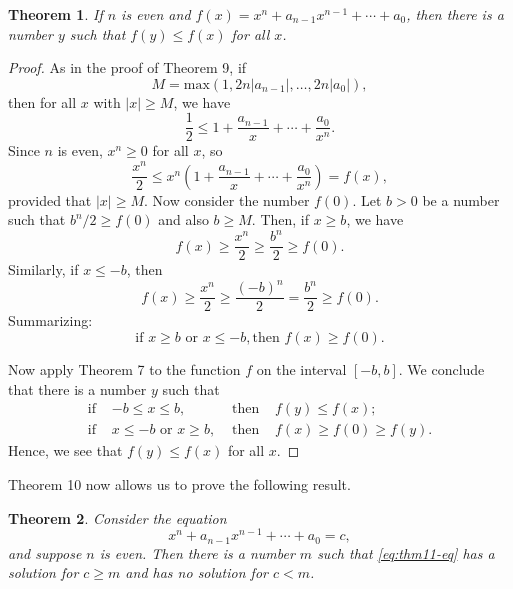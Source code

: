 \documentclass{article}
\newtheorem{theorem}{Theorem}
\begin{document}
\begin{theorem}
  If $n$ is even and $f(x) = x^n + a_{n-1}x^{n-1} + \cdots + a_0$, then there
  is a number $y$ such that $f(y) \leq f(x)$ for all $x$.
\end{theorem}

\begin{proof}
  As in the proof of Theorem 9, if \begin{equation*}
    M = \mathrm{max}(1, 2n|a_{n-1}|, \ldots, 2n|a_0|),
  \end{equation*}
  then for all $x$ with $|x| \geq M$, we have \begin{equation*}
    \frac{1}{2} \leq 1 + \frac{a_{n-1}}{x} + \cdots + \frac{a_0}{x^n}.
  \end{equation*}
  Since $n$ is even, $x^n \geq 0$ for all $x$, so \begin{equation*}
    \frac{x^n}{2} \leq x^n\left(1 + \frac{a_{n-1}}{x} + \cdots +
      \frac{a_0}{x^n}\right) = f(x),
  \end{equation*}
  provided that $|x| \geq M$. Now consider the number $f(0)$. Let $b > 0$ be a
  number such that $b^n/2 \geq f(0)$ and also $b \geq M$. Then, if $x \geq b$,
  we have \begin{equation*}
    f(x) \geq \frac{x^n}{2} \geq \frac{b^n}{2} \geq f(0).
  \end{equation*}
  Similarly, if $x \leq -b$, then \begin{equation*}
    f(x) \geq \frac{x^n}{2} \geq \frac{(-b)^n}{2} = \frac{b^n}{2} \geq f(0).
  \end{equation*}
  Summarizing: \begin{equation*}
    \text{if } x \geq b \text{ or } x \leq -b, \text{then } f(x) \geq f(0).
  \end{equation*}

  Now apply Theorem 7 to the function $f$ on the interval $[-b, b]$. We
  conclude that there is a number $y$ such that \begin{align*}
    \text{if } &-b \leq x \leq b, &\text{ then } &f(y) \leq f(x); \\
    \text{if } &x \leq -b \text{ or } x \geq b, &\text{ then } &f(x) \geq f(0)
      \geq f(y).
  \end{align*}
  Hence, we see that $f(y) \leq f(x)$ for all $x$.
\end{proof}

Theorem 10 now allows us to prove the following result.

\begin{theorem}
  Consider the equation \begin{equation*}
    x^n + a_{n-1}x^{n-1} + \cdots + a_0 = c, \label{eq:thm11-eq} \tag{*}
  \end{equation*}
  and suppose $n$ is even. Then there is a number $m$ such that
  \eqref{eq:thm11-eq} has a solution for $c \geq m$ and has no solution for $c
  < m$.
\end{theorem}
\end{document}
